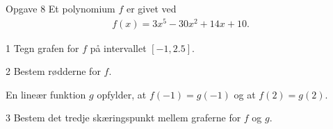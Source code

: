 
\begin{opgavetekst}{Opgave 8}
	Et polynomium $f$ er givet ved
	\begin{align*}
		f(x) = 3x^5-30x^2+14x+10.
	\end{align*}
\end{opgavetekst}
\begin{delopgave}{}{1}
	Tegn grafen for $f$ på intervallet $[-1,2.5]$.
\end{delopgave}
\begin{delopgave}{}{2}
	Bestem rødderne for $f$. 
\end{delopgave}
\begin{meretekst}
	En lineær funktion $g$ opfylder, at $f(-1) = g(-1)$ og at $f(2) = g(2)$.
\end{meretekst}
\begin{delopgave}{}{3}
	Bestem det tredje skæringspunkt mellem graferne for $f$ og $g$. 
\end{delopgave}

